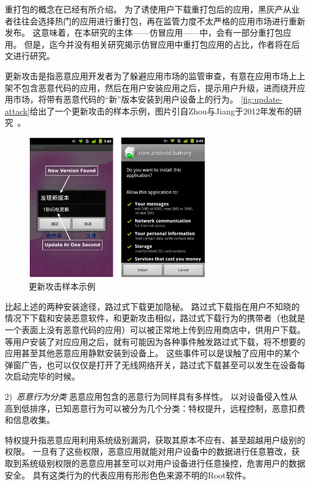重打包的概念在已经有所介绍。
为了诱使用户下载重打包后的应用，黑灰产从业者往往会选择热门的应用进行重打包，再在监管力度不太严格的应用市场进行重新发布。
这意味着，在本研究的主体——仿冒应用——中，会有一部分重打包应用。
但是，迄今并没有相关研究揭示仿冒应用中重打包应用的占比，作者将在后文进行研究。

更新攻击是指恶意应用开发者为了躲避应用市场的监管审查，有意在应用市场上上架不包含恶意代码的应用，然后在用户安装应用之后，提示用户升级，进而绕开应用市场，将带有恶意代码的``新''版本安装到用户设备上的行为。
\autoref{fig:update-attack}给出了一个更新攻击的样本示例，图片引自Zhou与Jiang于2012年发布的研究~\cite{Zhou2012DissectingAM}。

\begin{figure}[h]
	\centering
	\includegraphics[width=0.7\textwidth]{./Figures/edwin-update-attack}
	\caption{更新攻击样本示例}
	\label{fig:update-attack}
	\vspace{-5mm}
\end{figure}

比起上述的两种安装途径，路过式下载更加隐秘。
路过式下载指在用户不知晓的情况下下载和安装恶意软件，和更新攻击相似，路过式下载行为的携带者（也就是一个表面上没有恶意代码的应用）可以被正常地上传到应用商店中，供用户下载。
等用户安装了对应应用之后，就有可能因为各种事件触发路过式下载，将不想要的应用甚至其他恶意应用静默安装到设备上。
这些事件可以是误触了应用中的某个弹窗广告，也可以仅仅是打开了无线网络开关，路过式下载甚至可以发生在设备每次启动完毕的时候。

2)\ \emph{恶意行为分类} \quad
恶意应用包含的恶意行为同样具有多样性。
以对设备侵入性从高到低排序，已知恶意行为可以被分为几个分类：特权提升，远程控制，恶意扣费和信息收集。

特权提升指恶意应用利用系统级别漏洞，获取其原本不应有、甚至超越用户级别的权限。
一旦有了这些权限，恶意应用就能对用户设备中的数据进行任意篡改，获取到系统级别权限的恶意应用甚至可以对用户设备进行任意操控，危害用户的数据安全。
具有这类行为的代表应用有形形色色来源不明的Root软件。

